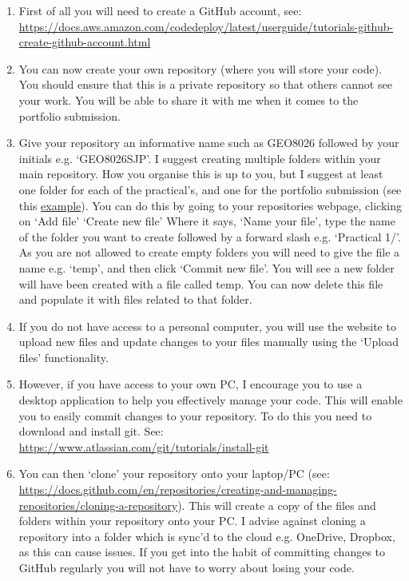 \documentclass[11pt,onecolumn,a4paper,notitlepage]{article}
\begin{document}
\begin{enumerate}
\item{First of all you will need to create a GitHub account, see: \url{https://docs.aws.amazon.com/codedeploy/latest/userguide/tutorials-github-create-github-account.html}}

\item{You can now create your own repository (where you will store your code). You should ensure that this is a private repository so that others cannot see your work. You will be able to share it with me when it comes to the portfolio submission.}

\item{Give your repository an informative name such as GEO8026 followed by your initials e.g. `GEO8026\textunderscore SJP'. I suggest creating multiple folders within your main repository. How you organise this is up to you, but I suggest at least one folder for each of the practical's, and one for the portfolio submission (see this \href{https://github.com/coastalscoop/GEO8026_23_24}{example}). You can do this by going to your repositories webpage, clicking on `Add file'  `Create new file' Where it says, `Name your file', type the name of the folder you want to create followed by a forward slash e.g. `Practical 1/'. As you are not allowed to create empty folders you will need to give the file a name e.g. `temp', and then click `Commit new file'. You will see a new folder will have been created with a file called temp. You can now delete this file and populate it with files related to that folder.}

\item{If you do not have access to a personal computer, you will use the website to upload new files and update changes to your files manually using the `Upload files' functionality.}

\item{However, if you have access to your own PC, I encourage you to use a desktop application to help you effectively manage your code. This will enable you to easily commit changes to your repository. To do this you need to download and install git. See: \url{https://www.atlassian.com/git/tutorials/install-git}}

\item{You can then `clone' your repository onto your laptop/PC (see: \url{https://docs.github.com/en/repositories/creating-and-managing-repositories/cloning-a-repository}). This will create a copy of the files and folders within your repository onto your PC. I advise against cloning a repository into a folder which is sync'd to the cloud e.g. OneDrive, Dropbox, as this can cause issues. If you get into the habit of committing changes to GitHub regularly you will not have to worry about losing your code.}


\end{enumerate}
\end{document}
